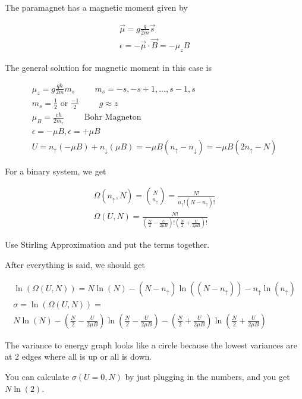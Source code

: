 \documentclass[fleqn]{report}
\newcommand{\hp}{\hspace{1cm}}
\newcommand{\equations} [1] {
\begin{gather*}
#1
\end{gather*}
}
\begin{document}
The paramagnet has a magnetic moment given by 
\equations{
    \vec \mu 
    =
    g \frac{q}{2m} \vec s 
    \\
    \epsilon 
    =
    - \vec \mu \cdot \vec B 
    =
    - \mu_z B
}

The general solution for magnetic moment in this case is 
\equations{
    \mu_z 
    =
    g \frac{q \hbar}{2 m} m_s
    \hp 
    m_s 
    =
    -s, -s + 1, \ldots , s-1, s
    \\
    m_s = \frac{1}{2} \textrm{ or } \frac{-1}{2}
    \hp 
    g \approx z 
    \\
    \mu_B
    =
    \frac{e \hbar }{2 m_e}
    \hp 
    \textrm{Bohr Magneton}
    \\
    \epsilon 
    =
    - \mu B
    , 
    \epsilon 
    =
    + \mu B
    \\
    U 
    =
    n_{\uparrow}
    (- \mu B)
    +
    n_{\downarrow}
    (\mu B)
    =
    - \mu B 
    (n_{\uparrow} - n_{\downarrow})
    =
    - \mu B 
    (2 n_{\uparrow} - N)
}

For a binary system, we get 
\equations{
    \Omega(n_{\uparrow}, N)
    =
    {N \choose n_{\uparrow}}
    =
    \frac{N!}{n_{\uparrow}! (N - n_{\uparrow})!}
    \\
    \Omega(U, N)
    =
    \frac{N!}
    {
        \left(
            \frac{N}{2}
            -
            \frac{U}{2 \mu B}
        \right)
        !
        \left(
            \frac{N}{2}
            +
            \frac{U}{2 \mu B}
        \right)
        !
    }
}
Use Stirling Approximation and put the terms together. 

After everything is said, we should get 
\equations{
    \ln(\Omega(U, N))
    =
    N \ln(N) 
    -
    (N - n_{\uparrow})
    \ln( (N - n_{\uparrow}))
    -
    n_{\uparrow }
    \ln( n_{\uparrow })
    \\
    \sigma 
    =
    \ln(\Omega(U, N))
    =
    \\
    N \ln(N) 
    -
    \left(
        \frac{N}{2}
        -
        \frac{U}{2 \mu B}
    \right)
    \ln(
        \frac{N}{2}
        -
        \frac{U}{2 \mu B}
    )
    -
    \left(
        \frac{N}{2}
        +
        \frac{U}{2 \mu B}
    \right)
    \ln(
        \frac{N}{2}
        +
        \frac{U}{2 \mu B}
    )
}

The variance to energy graph looks like a circle because 
the lowest variances are at 2 edges where all is up 
or all is down.

You can calculate $\sigma(U = 0, N)$ by just plugging in the 
numbers, and you get $N \ln(2)$.
\end{document}

